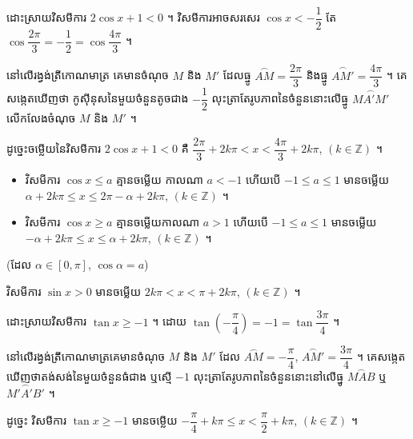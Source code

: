\begin{example}[ឧទាហរណ៍ ២]
ដោះស្រាយវិសមីការ $2\cos x + 1 < 0$ ។ វិសមីការអាចសរសេរ $\cos x < -\dfrac{1}{2}$ តែ $\cos\dfrac{2\pi}{3} = -\dfrac{1}{2} = \cos\dfrac{4\pi}{3}$ ។

នៅលើរង្វង់ត្រីកោណមាត្រ គេមានចំណុច $M$ និង $M'$ ដែលធ្នូ $\overset{\frown}{AM} = \dfrac{2\pi}{3}$ និងធ្នូ $\overset{\frown}{AM'} = \dfrac{4\pi}{3}$ ។ គេសង្កេតឃើញថា កូស៊ីនុសនៃមួយចំនួនតូចជាង $-\dfrac{1}{2}$ លុះត្រាតែរូបភាពនៃចំនួននោះលើធ្នូ $\overset{\frown}{MA'M'}$ លើកលែងចំណុច $M$ និង $M'$ ។
\begin{center}
\end{center}
ដូច្នេះចម្លើយនៃវិសមីការ $2\cos x + 1 < 0$ គឺ $\dfrac{2\pi}{3} + 2k\pi < x < \dfrac{4\pi}{3} + 2k\pi$, $(k \in \mathbb{Z})$ ។
\end{example}

\begin{formulaBox}[ជាទូទៅ]
\begin{itemize}
  \item វិសមីការ $\cos x \le a$ គ្មានចម្លើយ កាលណា $a < -1$ ហើយបើ $-1 \le a \le 1$ មានចម្លើយ $\alpha + 2k\pi \le x \le 2\pi - \alpha + 2k\pi$, $(k \in \mathbb{Z})$ ។
  \item វិសមីការ $\cos x \ge a$ គ្មានចម្លើយកាលណា $a > 1$ ហើយបើ $-1 \le a \le 1$ មានចម្លើយ $-\alpha + 2k\pi \le x \le \alpha + 2k\pi$, $(k \in \mathbb{Z})$ ។
\end{itemize}
(ដែល $\alpha \in [0, \pi]$, $\cos\alpha = a$)
\end{formulaBox}

\begin{note}[ករណីពិសេស]
វិសមីការ $\sin x > 0$ មានចម្លើយ $2k\pi < x < \pi + 2k\pi$, $(k \in \mathbb{Z})$ ។
\end{note}

\begin{example}[ឧទាហរណ៍ ៣]
ដោះស្រាយវិសមីការ $\tan x \ge -1$ ។ ដោយ $\tan\left(-\dfrac{\pi}{4}\right) = -1 = \tan\dfrac{3\pi}{4}$ ។

នៅលើរង្វង់ត្រីកោណមាត្រគេមានចំណុច $M$ និង $M'$ ដែល $\overset{\frown}{AM} = -\dfrac{\pi}{4}$, $\overset{\frown}{AM'} = \dfrac{3\pi}{4}$ ។ គេសង្កេតឃើញថាតង់សង់នៃមួយចំនួនធំជាង ឬស្មើ $-1$ លុះត្រាតែរូបភាពនៃចំនួននោះនៅលើធ្នូ $\overset{\frown}{MAB}$ ឬ $\overset{\frown}{M'A'B'}$ ។

ដូច្នេះ វិសមីការ $\tan x \ge -1$ មានចម្លើយ $-\dfrac{\pi}{4} + k\pi \le x < \dfrac{\pi}{2} + k\pi$, $(k \in \mathbb{Z})$ ។
\end{example}

